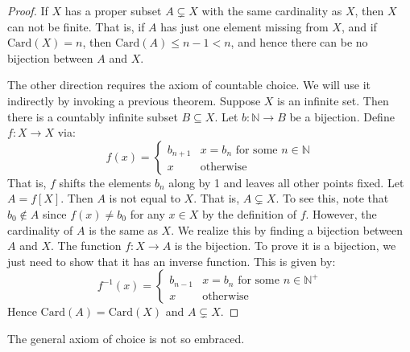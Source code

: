 \documentclass{article}
\theoremstyle{plain}
\theoremstyle{normal}
\begin{document}
        \begin{proof}
            If $X$ has a proper subset $A\subsetneq{X}$ with the same
            cardinality as $X$, then $X$ can not be finite. That is, if
            $A$ has just one element missing from $X$, and if
            $\textrm{Card}(X)=n$, then $\textrm{Card}(A)\leq{n-1}<n$, and hence
            there can be no bijection between $A$ and $X$.
            \par\hfill\par
            The other direction requires the axiom of countable choice. We will
            use it indirectly by invoking a previous theorem. Suppose $X$ is
            an infinite set. Then there is a countably infinite subset
            $B\subseteq{X}$. Let $b:\mathbb{N}\rightarrow{B}$ be a bijection.
            Define $f:X\rightarrow{X}$ via:
            \begin{equation}
                f(x)=
                \begin{cases}
                    b_{n+1}&x=b_{n}\textrm{ for some }n\in\mathbb{N}\\
                    x&\textrm{otherwise}
                \end{cases}
            \end{equation}
            That is, $f$ shifts the elements $b_{n}$ along by 1 and leaves all
            other points fixed. Let $A=f[X]$. Then $A$ is not equal to $X$.
            That is, $A\subsetneq{X}$. To see this, note that
            $b_{0}\notin{A}$ since $f(x)\ne{b}_{0}$ for any $x\in{X}$ by the
            definition of $f$. However, the cardinality of $A$ is the same as
            $X$. We realize this by finding a bijection between $A$ and $X$.
            The function $f:X\rightarrow{A}$ is the bijection. To prove it is
            a bijection, we just need to show that it has an inverse function.
            This is given by:
            \begin{equation}
                f^{-1}(x)=
                \begin{cases}
                    b_{n-1}&x=b_{n}\textrm{ for some }n\in\mathbb{N}^{+}\\
                    x&\textrm{otherwise}
                \end{cases}
            \end{equation}
            Hence $\textrm{Card}(A)=\textrm{Card}(X)$ and
            $A\subsetneq{X}$.
        \end{proof}
        The general axiom of choice is not so embraced.
\end{document}
